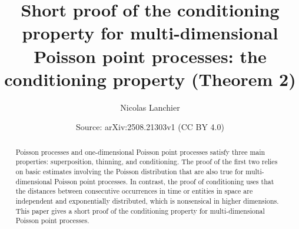\documentclass[10pt,a4paper]{amsart}
\title[Conditioning property for multi-dimensional Poisson point processes]{Short proof of the conditioning property for multi-dimensional Poisson point processes: the conditioning property (Theorem 2)}
\author{Nicolas Lanchier}
\date{Source: arXiv:2508.21303v1 (CC BY 4.0)}
\begin{document}
\begin{abstract}
Poisson processes and one-dimensional Poisson point processes satisfy three main properties: superposition, thinning, and conditioning.
The proof of the first two relies on basic estimates involving the Poisson distribution that are also true for multi-dimensional Poisson point processes.
In contrast, the proof of conditioning uses that the distances between consecutive occurrences in time or entities in space are independent and exponentially distributed, which is nonsensical in higher dimensions.
This paper gives a short proof of the conditioning property for multi-dimensional Poisson point processes.
\end{abstract}
\maketitle
\end{document}
